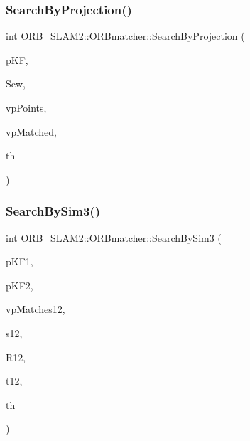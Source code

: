\mbox{\label{class_o_r_b___s_l_a_m2_1_1_o_r_bmatcher_ac1c0dcdeed922c9a96760aa9a76a2fdb}} 
\subsubsection{\texorpdfstring{Search\+By\+Projection()}{SearchByProjection()}\hspace{0.1cm}{\footnotesize\ttfamily [4/4]}}
{\footnotesize\ttfamily int O\+R\+B\+\_\+\+S\+L\+A\+M2\+::\+O\+R\+Bmatcher\+::\+Search\+By\+Projection (\begin{DoxyParamCaption}\item[{\mbox{\hyperlink{class_o_r_b___s_l_a_m2_1_1_key_frame}{Key\+Frame}} $\ast$}]{p\+KF,  }\item[{cv\+::\+Mat}]{Scw,  }\item[{const std\+::vector$<$ \mbox{\hyperlink{class_o_r_b___s_l_a_m2_1_1_map_point}{Map\+Point}} $\ast$$>$ \&}]{vp\+Points,  }\item[{std\+::vector$<$ \mbox{\hyperlink{class_o_r_b___s_l_a_m2_1_1_map_point}{Map\+Point}} $\ast$$>$ \&}]{vp\+Matched,  }\item[{int}]{th }\end{DoxyParamCaption})}

\mbox{\label{class_o_r_b___s_l_a_m2_1_1_o_r_bmatcher_a9b9c641423a8075aa2a6f1d5bab4d211}} 
\subsubsection{\texorpdfstring{Search\+By\+Sim3()}{SearchBySim3()}}
{\footnotesize\ttfamily int O\+R\+B\+\_\+\+S\+L\+A\+M2\+::\+O\+R\+Bmatcher\+::\+Search\+By\+Sim3 (\begin{DoxyParamCaption}\item[{\mbox{\hyperlink{class_o_r_b___s_l_a_m2_1_1_key_frame}{Key\+Frame}} $\ast$}]{p\+K\+F1,  }\item[{\mbox{\hyperlink{class_o_r_b___s_l_a_m2_1_1_key_frame}{Key\+Frame}} $\ast$}]{p\+K\+F2,  }\item[{std\+::vector$<$ \mbox{\hyperlink{class_o_r_b___s_l_a_m2_1_1_map_point}{Map\+Point}} $\ast$$>$ \&}]{vp\+Matches12,  }\item[{const float \&}]{s12,  }\item[{const cv\+::\+Mat \&}]{R12,  }\item[{const cv\+::\+Mat \&}]{t12,  }\item[{const float}]{th }\end{DoxyParamCaption})}

